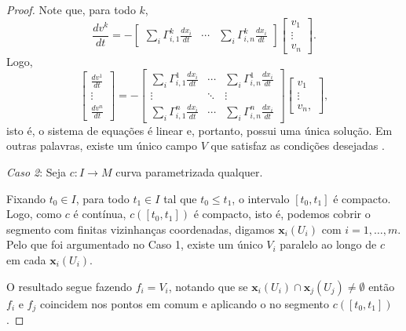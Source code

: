 \begin{proposition}
\begin{proof}
		Note que, para todo $k$,
		\begin{equation*}
			\frac{dv^{k}}{dt}=-\begin{bmatrix}
				\sum_{i}\Gamma_{i,1}^{k}\frac{dx_{i}}{dt} & \cdots & \sum_{i}\Gamma_{i,n}^{k}\frac{dx_{i}}{dt}
			\end{bmatrix}\begin{bmatrix}
				v_{1} \\ \vdots \\ v_{n}
			\end{bmatrix}.
		\end{equation*}
		Logo,
		\begin{equation*}
			\begin{bmatrix}
				\frac{dv^{1}}{dt} \\ \vdots \\ \frac{dv^{n}}{dt}
			\end{bmatrix} = -\begin{bmatrix}
				\sum_{i}\Gamma_{i,1}^{1}\frac{dx_{i}}{dt} & \cdots & \sum_{i}\Gamma_{i,n}^{1}\frac{dx_{i}}{dt} \\
				\vdots                                    & \ddots & \vdots                                    \\
				\sum_{i}\Gamma_{i,1}^{n}\frac{dx_{i}}{dt} & \cdots & \sum_{i}\Gamma_{i,n}^{n}\frac{dx_{i}}{dt}
			\end{bmatrix} \begin{bmatrix}
				v_{1}  \\
				\vdots \\
				v_{n},
			\end{bmatrix},
		\end{equation*}
		isto é, o sistema de equações é linear e, portanto, possui uma única solução. Em outras palavras, existe um único campo $V$ que satisfaz as condições desejadas \cite{doCarmo1992}.

		\emph{Caso 2}: Seja $c:I\to M$ curva parametrizada qualquer.

		Fixando $t_{0}\in I$, para todo $t_{1} \in I$ tal que $t_{0} \leq t_{1}$, o intervalo $[t_{0}, t_{1}]$ é compacto. Logo, como $c$ é contínua, $c([t_{0},t_{1}])$ é compacto, isto é, podemos cobrir o segmento com finitas vizinhanças coordenadas, digamos $\mathbf{x}_{i}(U_{i})$ com $i=1, \dots, m$.
		Pelo que foi argumentado no Caso 1, existe um único $V_{i}$ paralelo ao longo de $c$ em cada $\mathbf{x}_{i}(U_{i})$.

		O resultado segue fazendo $f_{i}=V_{i}$, notando que se $\mathbf{x}_{i}(U_{i})\cap \mathbf{x}_{j}(U_{j})\neq \emptyset$ então $f_{i}$ e $f_{j}$ coincidem nos pontos em comum e aplicando o  no segmento $c([t_{0},t_{1}])$.
	\end{proof}
\end{proposition}
